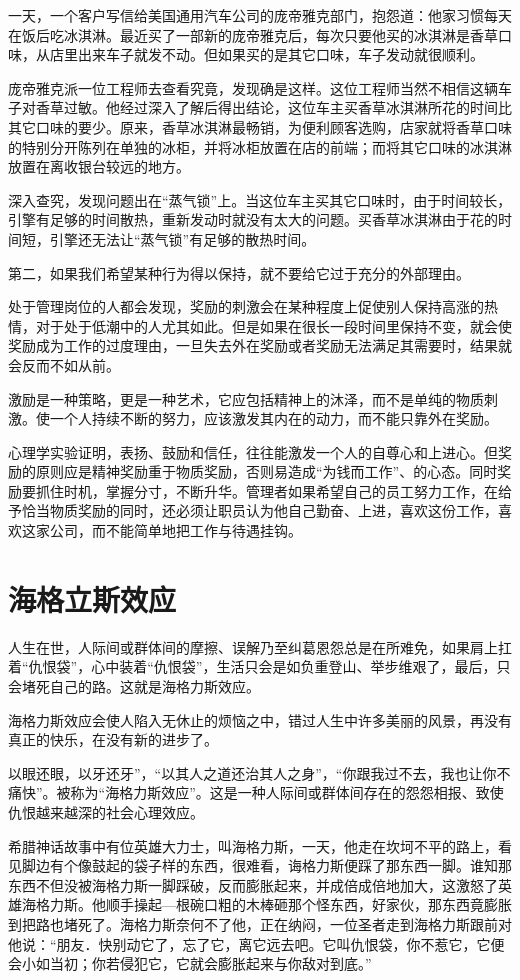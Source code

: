 \documentclass[11pt]{ctexart}
\begin{document}
一天，一个客户写信给美国通用汽车公司的庞帝雅克部门，抱怨道：他家习惯每天在饭后吃冰淇淋。最近买了一部新的庞帝雅克后，每次只要他买的冰淇淋是香草口味，从店里出来车子就发不动。但如果买的是其它口味，车子发动就很顺利。

庞帝雅克派一位工程师去查看究竟，发现确是这样。这位工程师当然不相信这辆车子对香草过敏。他经过深入了解后得出结论，这位车主买香草冰淇淋所花的时间比其它口味的要少。原来，香草冰淇淋最畅销，为便利顾客选购，店家就将香草口味的特别分开陈列在单独的冰柜，并将冰柜放置在店的前端；而将其它口味的冰淇淋放置在离收银台较远的地方。

深入查究，发现问题出在“蒸气锁”上。当这位车主买其它口味时，由于时间较长，引擎有足够的时间散热，重新发动时就没有太大的问题。买香草冰淇淋由于花的时间短，引擎还无法让“蒸气锁”有足够的散热时间。

第二，如果我们希望某种行为得以保持，就不要给它过于充分的外部理由。

处于管理岗位的人都会发现，奖励的刺激会在某种程度上促使别人保持高涨的热情，对于处于低潮中的人尤其如此。但是如果在很长一段时间里保持不变，就会使奖励成为工作的过度理由，一旦失去外在奖励或者奖励无法满足其需要时，结果就会反而不如从前。

激励是一种策略，更是一种艺术，它应包括精神上的沐泽，而不是单纯的物质刺激。使一个人持续不断的努力，应该激发其内在的动力，而不能只靠外在奖励。

心理学实验证明，表扬、鼓励和信任，往往能激发一个人的自尊心和上进心。但奖励的原则应是精神奖励重于物质奖励，否则易造成“为钱而工作”、的心态。同时奖励要抓住时机，掌握分寸，不断升华。管理者如果希望自己的员工努力工作，在给予恰当物质奖励的同时，还必须让职员认为他自己勤奋、上进，喜欢这份工作，喜欢这家公司，而不能简单地把工作与待遇挂钩。
\section{海格立斯效应}
\label{sec-43}


人生在世，人际间或群体间的摩擦、误解乃至纠葛恩怨总是在所难免，如果肩上扛着“仇恨袋”，心中装着“仇恨袋”，生活只会是如负重登山、举步维艰了，最后，只会堵死自己的路。这就是海格力斯效应。

海格力斯效应会使人陷入无休止的烦恼之中，错过人生中许多美丽的风景，再没有真正的快乐，在没有新的进步了。

以眼还眼，以牙还牙”，“以其人之道还治其人之身”，“你跟我过不去，我也让你不痛快”。被称为“海格力斯效应”。这是一种人际间或群体间存在的怨怨相报、致使仇恨越来越深的社会心理效应。

希腊神话故事中有位英雄大力士，叫海格力斯，一天，他走在坎坷不平的路上，看见脚边有个像鼓起的袋子样的东西，很难看，诲格力斯便踩了那东西一脚。谁知那东西不但没被海格力斯一脚踩破，反而膨胀起来，并成倍成倍地加大，这激怒了英雄海格力斯。他顺手操起—根碗口粗的木棒砸那个怪东西，好家伙，那东西竟膨胀到把路也堵死了。海格力斯奈何不了他，正在纳闷，一位圣者走到海格力斯跟前对他说：“朋友．快别动它了，忘了它，离它远去吧。它叫仇恨袋，你不惹它，它便会小如当初；你若侵犯它，它就会膨胀起来与你敌对到底。”
\end{document}
